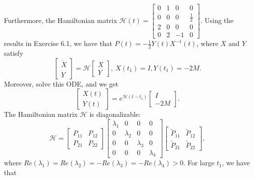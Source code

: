 \documentclass[11pt]{report}
\begin{document}
\noindent Furthermore, the Hamiltonian matrix $\mathcal{H}(t) = \begin{bmatrix}0 & 1 & 0 & 0\\ 0 & 0 & 0 & \frac{1}{2}\\ 2 & 0 & 0 & 0 \\0 & 2 & -1 & 0\end{bmatrix}$. Using the results in Exercise 6.1, we have that $P(t) = -\frac{1}{2}Y(t)X^{-1}(t)$, where $X$ and $Y$ satisfy
\[
\begin{bmatrix}\dot{X}\\\dot{Y}\end{bmatrix} = \mathcal{H}\begin{bmatrix}X\\Y\end{bmatrix},~X(t_1) = I, Y(t_1) = -2M.
\]
Moreover, solve this ODE, and we get
\[
\begin{bmatrix}X(t)\\Y(t)\end{bmatrix} = e^{\mathcal{H}(t-t_1)} \begin{bmatrix}I\\-2M\end{bmatrix}.
\]
The Hamiltonian matrix $\mathcal{H}$ is diagonalizable:
\[
\mathcal{H} = \begin{bmatrix}P_{11} & P_{12}\\P_{21} & P_{22}\end{bmatrix} \begin{bmatrix}\lambda_1 & 0 & 0 & 0\\ 0 & \lambda_2 & 0 & 0\\ 0 & 0 & \lambda_3 & 0\\0 & 0 & 0 & \lambda_4\end{bmatrix} \begin{bmatrix}\tilde{P}_{11} & \tilde{P}_{12}\\\tilde{P}_{21} & \tilde{P}_{22}\end{bmatrix},
\]
where $Re(\lambda_1) = Re(\lambda_2) = -Re(\lambda_3) = -Re(\lambda_4) > 0$.
For large $t_1$, we have that
\end{document}
